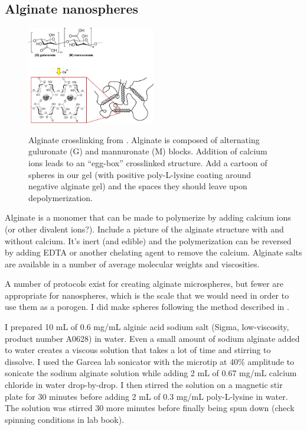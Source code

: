 \subsection{Alginate nanospheres}
\begin{figure}
\caption{Alginate crosslinking from \cite{bruchet15}. Alginate is composed of alternating guluronate (G) and mannuronate (M) blocks.  Addition of calcium ions leads to an ``egg-box'' crosslinked structure. Add a cartoon of spheres in our gel (with positive poly-L-lysine coating around negative alginate gel) and the spaces they should leave upon depolymerization.}
\centering
\includegraphics[width=0.5\textwidth]{figs/ch03/alginate-crosslinking}
\label{fig:alginate}
\end{figure}
Alginate is a monomer that can be made to polymerize by adding calcium ions (or other divalent ions?).  Include a picture of the alginate structure with and without calcium.  It's inert (and edible) and the polymerization can be reversed by adding EDTA or another chelating agent to remove the calcium.  Alginate salts are available in a number of average molecular weights and viscosities.

A number of protocols exist for creating alginate microspheres, but fewer are appropriate for nanospheres, which is the scale that we would need in order to use them as a porogen.  I did make spheres following the method described in \cite{de03}.

I prepared 10 mL of 0.6 mg/mL alginic acid sodium salt (Sigma, low-viscosity, product number A0628) in water.  Even a small amount of sodium alginate added to water creates a viscous solution that takes a lot of time and stirring to dissolve.  I used the Garcea lab sonicator with the microtip at 40\% amplitude to sonicate the sodium alginate solution while adding 2 mL of 0.67 mg/mL calcium chloride in water drop-by-drop.  I then stirred the solution on a magnetic stir plate for 30 minutes before adding 2 mL of 0.3 mg/mL poly-L-lysine in water.  The solution was stirred 30 more minutes before finally being spun down (check spinning conditions in lab book).


